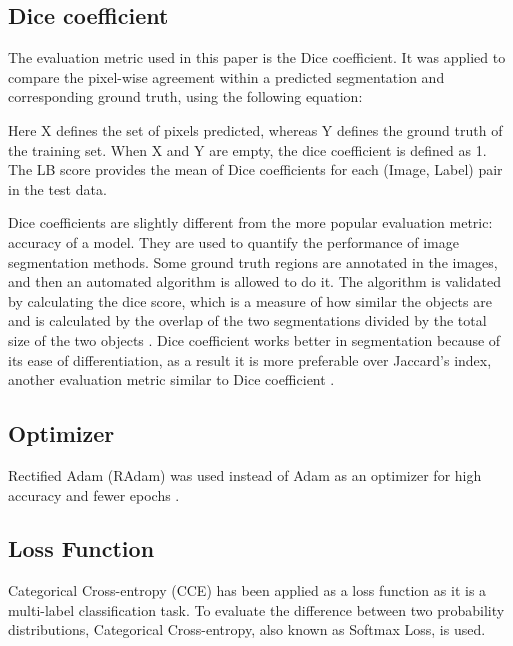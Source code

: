 \documentclass[conference]{IEEEtran}
\begin{document}
\subsection{Dice coefficient}\label{dsc}

The evaluation metric used in this paper is the Dice coefficient. It was applied to compare the pixel-wise agreement within a predicted segmentation and corresponding ground truth, using the following equation:


\begin{center}

\end{center}

Here X defines the set of pixels predicted, whereas Y defines the ground truth of the training set. When X and Y are empty, the dice coefficient is defined as 1. The LB score provides the mean of Dice coefficients for each (Image, Label) pair in the test data.

Dice coefficients are slightly different from the more popular evaluation metric: accuracy of a model. They are used to quantify the performance of image segmentation methods. Some ground truth regions are annotated in the images, and then an automated algorithm is allowed to do it. The algorithm is validated by calculating the dice score, which is a measure of how similar the objects are and is calculated by the overlap of the two segmentations divided by the total size of the two objects \cite{dice1945measures}.  Dice coefficient works better in segmentation because of its ease of differentiation, as a result it is more preferable over Jaccard's index, another evaluation metric similar to Dice coefficient \cite{niwattanakul2013using}.


\subsection{Optimizer}  
Rectified Adam (RAdam) was used instead of Adam as an optimizer for high accuracy and fewer epochs \cite{liu2019variance}.   







\subsection{Loss Function}
Categorical Cross-entropy (CCE) has been applied as a loss function as it is a multi-label classification task.  To evaluate the difference between two probability distributions, Categorical Cross-entropy, also known as Softmax Loss, is used.
\end{document}
